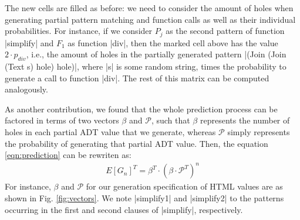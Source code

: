The new cells are filled as before: we need to consider the amount of holes when
generating partial pattern matching and function calls as well as their
individual probabilities.
%
%
For instance, if we consider $P_j$ as the second pattern of function |simplify|
and $F_1$ as function |div|, then the marked cell above has the value
$2\cdot p_{div}$, i.e., the amount of holes in the partially generated pattern
|(Join (Join (Text s) hole) hole)|, where |s| is some random string, times the
probability to generate a call to function |div|.
%
The rest of this matrix can be computed analogously.

%

As another contribution, we found that the whole prediction process can be
factored in terms of two vectors $\beta$ and $\mathcal{P}$, such that $\beta$
represents the number of holes in each partial ADT value that we generate,
whereas $\mathcal{P}$ simply represents the probability of generating that
partial ADT value.%
%
Then, the equation \ref{eqn:prediction} can be rewriten as:
%
\begin{align*}
  E[G_n]^T = \beta^T \cdot (\beta \cdot \mathcal{P}^T)^{n}
\end{align*}
%
%
For instance, $\beta$ and $\mathcal{P}$ for our generation specification of HTML
values are as shown in Fig. \ref{fig:vectors}.
%
We note |simplify1| and |simplify2| to the patterns occurring in the first and
second clauses of |simplify|, respectively.

